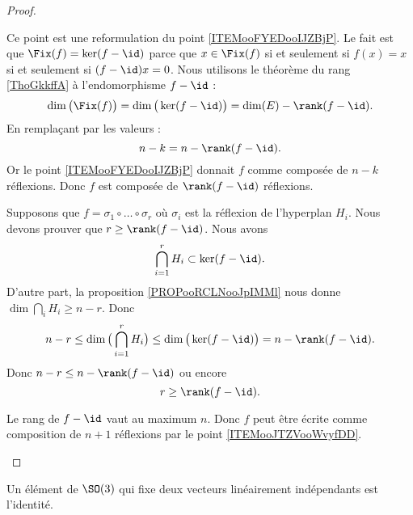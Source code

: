 \begin{proof}
\begin{subproof}
		Ce point est une reformulation du point \ref{ITEMooFYEDooIJZBjP}. Le fait est que \( \Fix(f)=\ker(f-\id)\) parce que \( x\in\Fix(f)\) si et seulement si \( f(x)=x\) si et seulement si \( (f-\id)x=0\). Nous utilisons le théorème du rang \ref{ThoGkkffA} à l'endomorphisme \( f-\id\) :
		\begin{equation}
			\dim\big( \Fix(f) \big)=\dim\big( \ker(f-\id) \big)=\dim(E)-\rank(f-\id).
		\end{equation}
		En remplaçant par les valeurs :
		\begin{equation}
			n-k=n-\rank(f-\id).
		\end{equation}
		Or le point \ref{ITEMooFYEDooIJZBjP} donnait \( f\) comme composée de \( n-k\) réflexions. Donc \( f\) est composée de \( \rank(f-\id)\) réflexions.

		Supposons que \( f=\sigma_1\circ\ldots \circ \sigma_r\) où \( \sigma_i\) est la réflexion de l'hyperplan \( H_i\). Nous devons prouver que \( r\geq \rank(f-\id)\). Nous avons
		\begin{equation}
			\bigcap_{i=1}^rH_i\subset \ker(f-\id).
		\end{equation}
		D'autre part, la proposition \ref{PROPooRCLNooJpIMMl} nous donne \( \dim\bigcap_iH_i\geq n-r\). Donc
		\begin{equation}
			n-r\leq \dim\big( \bigcap_{i=1}^r H_i\big)\leq\dim\big( \ker(f-\id) \big)=n-\rank(f-\id).
		\end{equation}
		Donc \( n-r\leq n-\rank(f-\id)\) ou encore
		\begin{equation}
			r\geq \rank(f-\id).
		\end{equation}

		Le rang de \( f-\id\) vaut au maximum \( n\). Donc \( f\) peut être écrite comme composition de \( n+1\) réflexions par le point \ref{ITEMooJTZVooWvyfDD}.
	\end{subproof}
\end{proof}

\begin{proposition}     \label{PROPooUSKEooUbNVfs}
	Un élément de \( \SO(3)\) qui fixe deux vecteurs linéairement indépendants est l'identité.
\end{proposition}

